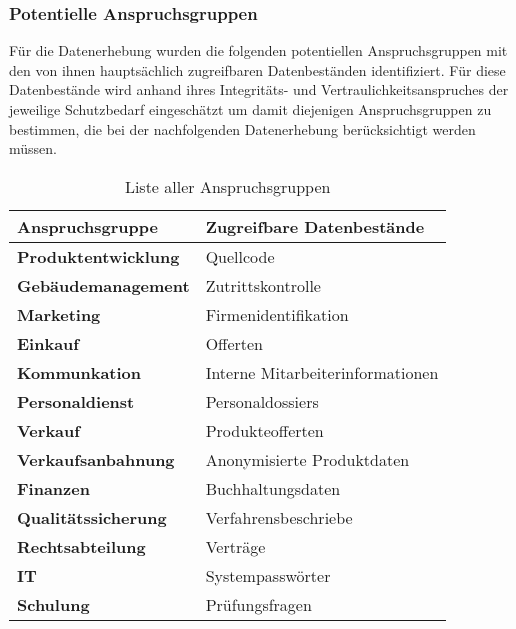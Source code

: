 \documentclass[../../main.tex]{subfiles}
\begin{document}
\subsubsection{Potentielle Anspruchsgruppen}

\begin{sloppypar}
Für die Datenerhebung wurden die folgenden potentiellen Anspruchsgruppen mit den von ihnen hauptsächlich zugreifbaren Datenbeständen identifiziert. Für diese Datenbestände wird anhand ihres Integritäts- und Vertraulichkeitsanspruches der jeweilige Schutzbedarf eingeschätzt um damit diejenigen Anspruchsgruppen zu bestimmen, die bei der nachfolgenden Datenerhebung berücksichtigt werden müssen.
\end{sloppypar}


\begin{table}[H]
\tablefontsize
\centering
\caption{Liste aller Anspruchsgruppen}
\label{potentielle_anspruchsgruppen}


\begin{tabular}{ |l|l| }


\hline
\tableheaderbgcolor
\textbf{Anspruchsgruppe} & \textbf{Zugreifbare Datenbestände}\\ 
\hline


\textbf{Produktentwicklung} & Quellcode                     \\ \hline
\textbf{Gebäudemanagement} & Zutrittskontrolle              \\ \hline
\textbf{Marketing} & Firmenidentifikation                   \\ \hline
\textbf{Einkauf} & Offerten                                 \\ \hline
\textbf{Kommunkation} & Interne Mitarbeiterinformationen    \\ \hline
\textbf{Personaldienst} & Personaldossiers                  \\ \hline
\textbf{Verkauf} & Produkteofferten                         \\ \hline
\textbf{Verkaufsanbahnung} & Anonymisierte Produktdaten     \\ \hline
\textbf{Finanzen} & Buchhaltungsdaten                       \\ \hline
\textbf{Qualitätssicherung} & Verfahrensbeschriebe          \\ \hline
\textbf{Rechtsabteilung} & Verträge                         \\ \hline
\textbf{IT} &  Systempasswörter                             \\ \hline
\textbf{Schulung} & Prüfungsfragen                          \\ \hline

\end{tabular}
\end{table}
\end{document}
